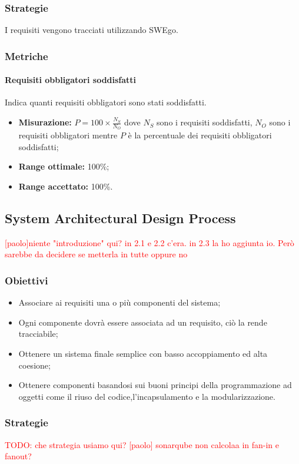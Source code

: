 \subsubsection{Strategie}
I requisiti vengono tracciati utilizzando SWEgo.
\subsubsection{Metriche}
\paragraph{Requisiti obbligatori soddisfatti} \Spazio
Indica quanti requisiti obbligatori sono stati soddisfatti.
\begin{itemize}
	 \item \textbf{Misurazione:} $P=100\times\frac{N_S}{N_O}$ dove $N_S$ sono i requisiti soddisfatti, $N_O$ sono i requisiti obbligatori mentre $P$ è la percentuale dei requisiti obbligatori soddisfatti;
	\item \textbf{Range ottimale:} 100\%;
	\item \textbf{Range accettato:} 100\%.
\end{itemize}

\subsection{System Architectural Design Process}
\textcolor{red} { [paolo]niente "introduzione" qui? in 2.1 e 2.2 c'era. in 2.3 la ho aggiunta io. Però sarebbe da decidere se metterla in tutte oppure no }
		\subsubsection{Obiettivi}
		\begin{itemize}
			\item Associare ai requisiti una o più componenti del sistema;
			\item Ogni componente dovrà essere associata ad un requisito, ciò la rende tracciabile;
			\item Ottenere un sistema finale semplice con basso accoppiamento ed alta coesione;
			\item Ottenere componenti basandosi sui buoni principi della programmazione ad oggetti come il riuso del codice,l'incapsulamento e la modularizzazione.
		\end{itemize}
		\subsubsection{Strategie}
		\textcolor{red} {TODO: che strategia usiamo qui? [paolo] sonarqube non calcolaa in fan-in e fanout?}
